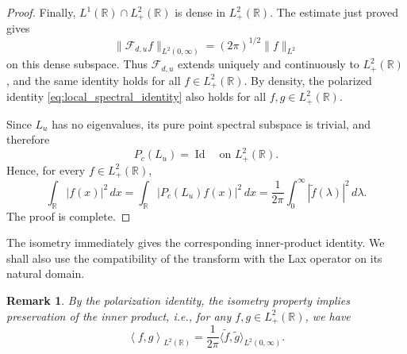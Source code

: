 \documentclass[10pt]{article}
\newtheorem{remark}[theorem]{Remark}
\numberwithin{equation}{section}
\numberwithin{theorem}{section}
\begin{document}
\begin{proof}
Finally, \(L^1(\mathbb R)\cap L^2_+(\mathbb R)\) is dense in
\(L^2_+(\mathbb R)\). The estimate just proved gives
\[
\|\mathcal F_{d,u}f\|_{L^2(0,\infty)}
=
(2\pi)^{1/2}\|f\|_{L^2}
\]
on this dense subspace. Thus \(\mathcal F_{d,u}\) extends uniquely and
continuously to \(L^2_+(\mathbb R)\), and the same identity holds for all
\(f\in L^2_+(\mathbb R)\). By density, the polarized identity
\eqref{eq:local_spectral_identity} also holds for all
\(f,g\in L^2_+(\mathbb R)\).

Since \(L_u\) has no eigenvalues, its pure point spectral subspace is trivial,
and therefore
\[
P_c(L_u)=\operatorname{Id}
\quad\text{on }L^2_+(\mathbb R).
\]
Hence, for every \(f\in L^2_+(\mathbb R)\),
\[
\int_{\mathbb R}|f(x)|^2\,dx
=
\int_{\mathbb R}|P_c(L_u)f(x)|^2\,dx
=
\frac{1}{2\pi}
\int_0^\infty|\widetilde f(\lambda)|^2\,d\lambda .
\]
The proof is complete.
\end{proof}
The isometry immediately gives the corresponding inner-product identity. We shall also
use the compatibility of the transform with the Lax operator on its natural domain.
\begin{remark}
By the polarization identity, the isometry property implies preservation of the inner product, i.e., for any $f, g \in L_{+}^2(\mathbb{R})$, we have
\begin{equation}
\label{2.4}
\left\langle f, g \right\rangle_{L^2(\mathbb{R})} = \frac{1}{2\pi}\langle \widetilde{f}, \widetilde{g} \rangle_{L^2(0,\infty)}.
\end{equation}
\end{remark}
\end{document}
